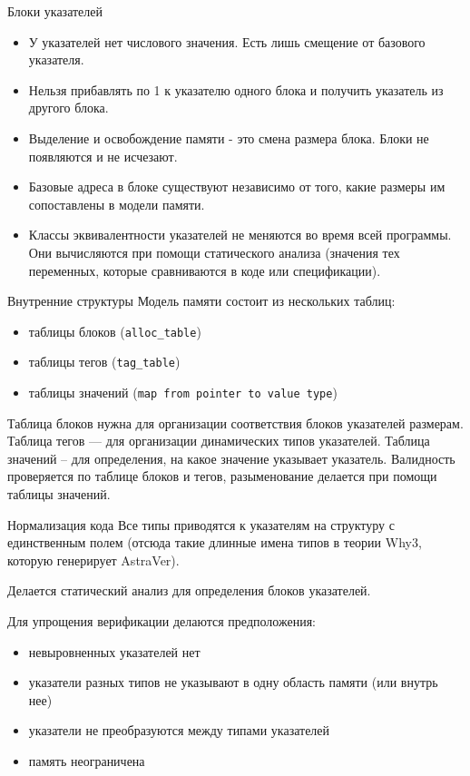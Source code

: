 \documentclass[hyperref={unicode=true}]{beamer}
\begin{document}
    \begin{frame}{Блоки указателей}
    \begin{itemize}
    \item У указателей нет числового значения. Есть лишь смещение от базового
    указателя.
    \item Нельзя прибавлять по 1 к указателю одного блока и получить
    указатель из другого блока.
    \item Выделение и освобождение памяти - это смена размера блока. Блоки не
    появляются и не исчезают.
    \item Базовые адреса в блоке существуют независимо от того, какие размеры
    им сопоставлены в модели памяти.
    \item Классы эквивалентности указателей не меняются во время всей программы.
    Они вычисляются при помощи статического анализа (значения тех переменных,
    которые сравниваются в коде или спецификации).
    \end{itemize}
    \end{frame}

    \begin{frame}{Внутренние структуры}
    Модель памяти состоит из нескольких таблиц:
    \begin{itemize}
    \item таблицы блоков (\texttt{alloc\_table})
    \item таблицы тегов (\texttt{tag\_table})
    \item таблицы значений (\texttt{map from pointer to value type})
    \end{itemize}

    Таблица блоков нужна для организации соответствия блоков указателей
    размерам. Таблица тегов --- для организации динамических типов указателей.
    Таблица значений -- для определения, на какое значение указывает указатель.
    Валидность проверяется по таблице блоков и тегов, разыменование делается
    при помощи таблицы значений.
    \end{frame}

    \begin{frame}{Нормализация кода}
    Все типы приводятся к указателям на структуру с единственным полем (отсюда
    такие длинные имена типов в теории Why3, которую генерирует AstraVer).

    Делается статический анализ для определения блоков указателей.

    Для упрощения верификации делаются предположения:
    \begin{itemize}
    \item невыровненных указателей нет
    \item указатели разных типов не указывают в одну область памяти (или внутрь
            нее)
    \item указатели не преобразуются между типами указателей
    \item память неограничена
    \end{itemize}
    \end{frame}
\end{document}
